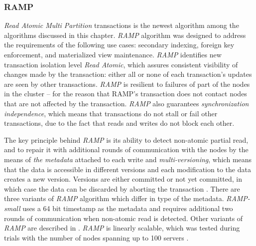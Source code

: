 




\subsubsection{RAMP}\label{sec:theory:transactions:ramp}
\emph{Read Atomic Multi Partition} transactions \cite{Bailis:2014} is the newest algorithm among the algorithms discussed in this chapter. 
\emph{RAMP} algorithm was designed to address the requirements of the following use cases: secondary indexing, foreign key
enforcement, and materialized view maintenance.
\emph{RAMP} identifies new transaction isolation level \emph{Read Atomic}, which 
assures consistent visibility of changes made by the transaction: either all or none of each transaction's updates are seen by other transactions.
\emph{RAMP} is resilient to failures of part of the nodes in the cluster -- for the reason that RAMP's transaction does not contact nodes that are not affected by the transaction. 
\emph{RAMP} also guarantees \emph{synchronization independence}, which means that transactions do not stall or fail other transactions, due to the fact that reads and writes do not block each other. 

The key principle behind \emph{RAMP} is its ability to detect non-atomic partial read, and to repair it with additional rounds of communication with the nodes by the means of \emph{the metadata} attached to each write and \emph{multi-versioning}, which means that the data is accessible in different versions and each modification to the data creates a new version. Versions are either committed or not yet committed, in which case the data can be discarded by aborting the transaction \cite[p. 6]{Bailis:2014}. 
There are three variants of \emph{RAMP} algorithm which differ in type of the metadata. \emph{RAMP-small} uses a 64 bit timestamp as the metadata and requires additional two rounds of communication when non-atomic read is detected. Other variants of \emph{RAMP} are described in \cite[p. 5]{Bailis:2014}.
\emph{RAMP} is linearly scalable, which was tested during trials with the number of nodes spanning up to 100 servers \cite[p. 10]{Bailis:2014}.

